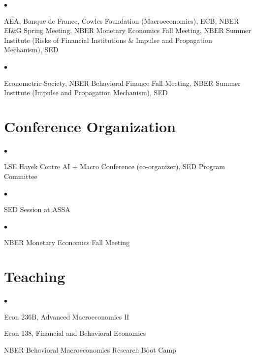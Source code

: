 \documentclass[line]{res}
\newenvironment{list1}{
  \begin{list}{\ding{113}}{%
      \setlength{\itemsep}{0.07in}
      \setlength{\parsep}{0in} \setlength{\parskip}{0in}
		\setlength{\topsep}{0.07in} \setlength{\partopsep}{0in}
      \setlength{\leftmargin}{0.0in}}}{\end{list}}
\newenvironment{list2}{
  \begin{list}{$\bullet$}{%
      \setlength{\itemsep}{0in}
      \setlength{\parsep}{0in} \setlength{\parskip}{0in}
      \setlength{\topsep}{0in} \setlength{\partopsep}{0in} 
      \setlength{\leftmargin}{0in}}}{\end{list}}
\begin{document}
\begin{resume}
\begin{list1}
\item[2017] 
\begin{list2}
\item[] AEA, Banque de France, Cowles Foundation (Macroeconomics), ECB, NBER Ef\&G Spring Meeting, NBER Monetary Economics Fall Meeting, NBER Summer Institute (Risks of Financial Institutions \& Impulse and Propagation Mechanism), SED
\end{list2}

\item[2016] 
\begin{list2}
\item[] Econometric Society, NBER Behavioral Finance Fall Meeting, NBER Summer Institute (Impulse and Propagation Mechanism), SED
\end{list2}


\end{list1}

\section{\sc Conference Organization}
\begin{list1}
\item[2026]  
\begin{list2}
\item[] LSE Hayek Centre AI + Macro Conference (co-organizer), SED Program Committee
\end{list2}
\item[2025]  
\begin{list2}
\item[] SED Session at ASSA
\end{list2}
\item[2024]  
\begin{list2}
\item[] NBER Monetary Economics Fall Meeting
\end{list2}
\end{list1}


\section{\sc Teaching}
\begin{list1}
\item[2026]  
\begin{list2}
\item[] Econ 236B, Advanced Macroeconomics II
\vspace{0.2cm}
\item[] Econ 138, Financial and Behavioral Economics
\vspace{0.2cm}
\item[] NBER Behavioral Macroeconomics Research Boot Camp
\end{list2}


\end{list1}
\end{resume}
\end{document}
